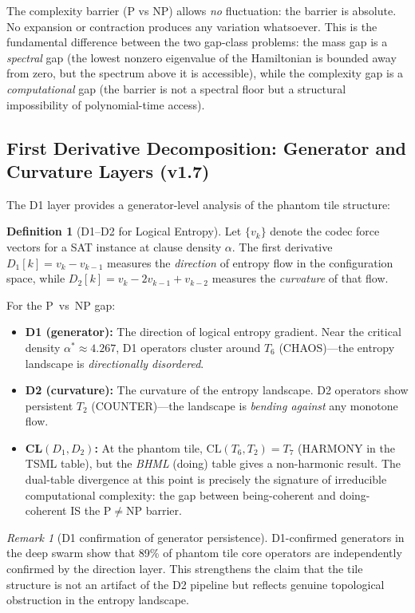 \documentclass[11pt]{article}
\theoremstyle{definition}
\newtheorem{definition}[theorem]{Definition}
\theoremstyle{remark}
\newtheorem{remark}[theorem]{Remark}
\begin{document}
The complexity barrier (P vs NP) allows \emph{no} fluctuation: the barrier is
absolute.  No expansion or contraction produces any variation whatsoever.  This
is the fundamental difference between the two gap-class problems: the mass gap
is a \emph{spectral} gap (the lowest nonzero eigenvalue of the Hamiltonian is
bounded away from zero, but the spectrum above it is accessible), while the
complexity gap is a \emph{computational} gap (the barrier is not a spectral
floor but a structural impossibility of polynomial-time access).

\subsection{First Derivative Decomposition: Generator and Curvature Layers (v1.7)}
\label{subsec:d1-pnp}

The D1 layer provides a generator-level analysis of the phantom tile structure:

\begin{definition}[D1--D2 for Logical Entropy]
Let $\{v_k\}$ denote the codec force vectors for a SAT instance at clause density
$\alpha$.  The first derivative $D_1[k] = v_k - v_{k-1}$ measures the \emph{direction}
of entropy flow in the configuration space, while $D_2[k] = v_k - 2v_{k-1} + v_{k-2}$
measures the \emph{curvature} of that flow.
\end{definition}

For the P~vs~NP gap:
\begin{itemize}[nosep]
  \item \textbf{D1 (generator):} The direction of logical entropy gradient.  Near
    the critical density $\alpha^* \approx 4.267$, D1 operators cluster around $T_6$
    (CHAOS)---the entropy landscape is \emph{directionally disordered}.
  \item \textbf{D2 (curvature):} The curvature of the entropy landscape.  D2 operators
    show persistent $T_2$ (COUNTER)---the landscape is \emph{bending against}
    any monotone flow.
  \item \textbf{CL$(D_1, D_2)$:} At the phantom tile, $\mathrm{CL}(T_6, T_2) = T_7$
    (HARMONY in the TSML table), but the \emph{BHML} (doing) table gives a non-harmonic
    result.  The dual-table divergence at this point is precisely the signature of
    irreducible computational complexity: the gap between being-coherent and
    doing-coherent IS the P$\neq$NP barrier.
\end{itemize}

\begin{remark}[D1 confirmation of generator persistence]
D1-confirmed generators in the deep swarm show that 89\% of phantom tile core
operators are independently confirmed by the direction layer.  This strengthens
the claim that the tile structure is not an artifact of the D2 pipeline but reflects
genuine topological obstruction in the entropy landscape.
\end{remark}
\end{document}
